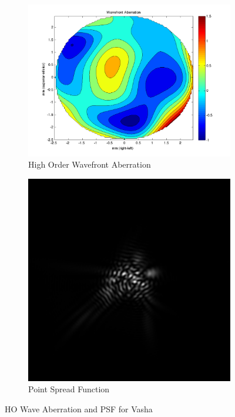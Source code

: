 \documentclass{article}
\begin{document}
\begin{figure}[H]
\begin{subfigure}{.5\textwidth}
  \centering
  \includegraphics[width=1\linewidth]{Vasha_WFA.png}
  \caption{High Order Wavefront Aberration}
  \label{fig:vashahowa}
\end{subfigure}%
\begin{subfigure}{.5\textwidth}
  \centering
  \includegraphics[width=.8\linewidth]{Vasha_PSF.png}
  \caption{Point Spread Function}
  \label{fig:vashapsf}
\end{subfigure}
\caption{HO Wave Aberration and PSF for Vasha}
\label{fig:vasha}
\end{figure}
\end{document}
